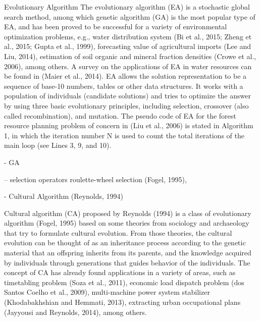 \documentclass[12pt]{caltech_thesis}
\begin{document}
\begin{bibunit}
Evolutionary Algorithm
The evolutionary algorithm (EA) is a stochastic global search
method, among which genetic algorithm (GA) is the most popular
type of EA, and has been proved to be successful for a variety of
environmental optimization problems, e.g., water distribution
system (Bi et al., 2015; Zheng et al., 2015; Gupta et al., 1999),
forecasting value of agricultural imports (Lee and Liu, 2014), estimation
of soil organic and mineral fraction densities (Crowe et al.,
2006), among others. A survey on the applications of EA in water
resources can be found in (Maier et al., 2014). EA allows the solution
representation to be a sequence of base-10 numbers, tables
or other data structures. It works with a population of individuals
(candidate solutions) and tries to optimize the answer by using
three basic evolutionary principles, including selection, crossover
(also called recombination), and mutation. The pseudo code of EA
for the forest resource planning problem of concern in (Liu et al.,
2006) is stated in Algorithm 1, in which the iteration number N
is used to count the total iterations of the main loop (see Lines 3, 9,
and 10).


- GA

-- selection operators
    roulette-wheel selection (Fogel, 1995),




- Cultural Algorithm (Reynolds, 1994)


Cultural algorithm (CA) proposed by Reynolds (1994) is a class of
evolutionary algorithm (Fogel, 1995) based on some theories from
sociology and archaeology that try to formulate cultural evolution.
From those theories, the cultural evolution can be thought of as an
inheritance process according to the genetic material that an
offspring inherits from its parents, and the knowledge acquired by
individuals through generations that guides behavior of the individuals.
The concept of CA has already found applications in a
variety of areas, such as timetabling problem (Soza et al., 2011),
economic load dispatch problem (dos Santos Coelho et al., 2009),
multi-machine power system stabilizer (Khodabakhshian and
Hemmati, 2013), extracting urban occupational plans (Jayyousi
and Reynolds, 2014), among others.


\end{bibunit}
\end{document}
